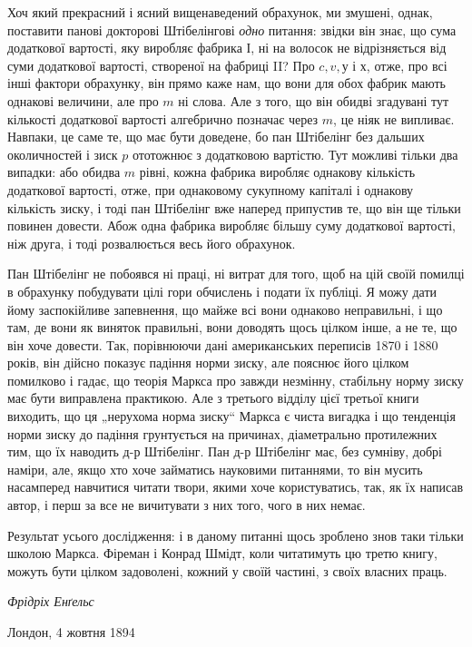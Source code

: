 
Хоч який прекрасний і ясний вищенаведений обрахунок, ми
змушені, однак, поставити панові докторові Штібелінгові \emph{одно}
питання: звідки він знає, що сума додаткової вартості, яку виробляє
фабрика І, ні на волосок не відрізняється від суми додаткової
вартості, створеної на фабриці II? Про $c, v, у$ і $х$, отже,
про всі інші фактори обрахунку, він прямо каже нам, що вони
для обох фабрик мають однакові величини, але про $m$ ні слова.
Але з того, що він обидві згадувані тут кількості додаткової
вартості алгебрично позначає через $m$, це ніяк не випливає.
Навпаки, це саме те, що має бути доведене, бо пан Штібелінг
без дальших околичностей і зиск $p$ ототожнює з додатковою
вартістю. Тут можливі тільки два випадки: або обидва $m$ рівні,
кожна фабрика виробляє однакову кількість додаткової вартості,
отже, при однаковому сукупному капіталі і однакову кількість
зиску, і тоді пан Штібелінг вже наперед припустив те, що він
ще тільки повинен довести. Абож одна фабрика виробляє більшу
суму додаткової вартості, ніж друга, і тоді розвалюється весь
його обрахунок.

Пан Штібелінг не побоявся ні праці, ні витрат для того, щоб
на цій своїй помилці в обрахунку побудувати цілі гори обчислень
і подати їх публіці. Я можу дати йому заспокійливе запевнення,
що майже всі вони однаково неправильні, і що там,
де вони як виняток правильні, вони доводять щось цілком інше,
а не те, що він хоче довести. Так, порівнюючи дані американських
переписів 1870 і 1880 років, він дійсно показує падіння
норми зиску, але пояснює його цілком помилково і гадає, що
теорія Маркса про завжди незмінну, стабільну норму зиску має
бути виправлена практикою. Але з третього відділу цієї третьої
книги виходить, що ця „нерухома норма зиску“ Маркса є чиста
вигадка і що тенденція норми зиску до падіння грунтується на
причинах, діаметрально протилежних тим, що їх наводить д-р
Штібелінг. Пан д-р Штібелінг має, без сумніву, добрі наміри,
але, якщо хто хоче займатись науковими питаннями, то він мусить
насамперед навчитися читати твори, якими хоче користуватись,
так, як їх написав автор, і перш за все не вичитувати
з них того, чого в них немає.

Результат усього дослідження: і в даному питанні щось
зроблено знов таки тільки школою Маркса. Фіреман і Конрад
Шмідт, коли читатимуть цю третю книгу, можуть бути цілком
задоволені, кожний у своїй частині, з своїх власних праць.

\begin{flushright}
\emph{Фрідріх Енґельс}
\end{flushright}

{\small Лондон, 4 жовтня 1894~}
